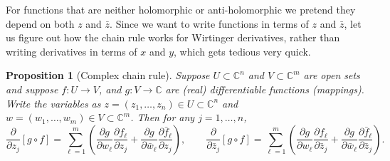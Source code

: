 \documentclass[12pt,openany]{book}
\newcommand{\C}{{\mathbb{C}}}
\theoremstyle{plain}
\newtheorem{prop}[thm]{Proposition}
\theoremstyle{remark}
\theoremstyle{definition}
\theoremstyle{exercise}
\theoremstyle{example}
\begin{document}
For functions that are neither holomorphic or anti-holomorphic we
pretend they depend on both $z$ and $\bar{z}$.
Since we want to write functions in terms of $z$ and $\bar{z}$,
let us figure out how the chain rule works for Wirtinger derivatives,
rather than writing derivatives in terms of $x$ and $y$, which
gets tedious very quick.

\begin{prop}[Complex chain rule]
Suppose 
$U \subset \C^n$ and $V \subset \C^m$ are open sets and suppose
$f \colon U \to V$, and $g \colon V \to \C$ are (real) differentiable
functions (mappings).  Write the variables as
$z = (z_1,\ldots,z_n) \in U \subset \C^n$ and $w = (w_1,\ldots,w_m) \in V
\subset \C^m$.  Then for any $j=1,\ldots,n$,
\begin{equation} \label{eq:chainrule}
\frac{\partial}{\partial z_j} \left[ g \circ f \right]
=
\sum_{\ell=1}^m \left(
\frac{\partial g}{\partial w_\ell}
\frac{\partial f_\ell}{\partial z_j}
+
\frac{\partial g}{\partial \bar{w}_\ell}
\frac{\partial \bar{f}_\ell}{\partial z_j}
\right),  \qquad
\frac{\partial}{\partial \bar{z}_j} \left[ g \circ f \right]
=
\sum_{\ell=1}^m \left(
\frac{\partial g}{\partial w_\ell}
\frac{\partial f_\ell}{\partial \bar{z}_j}
+
\frac{\partial g}{\partial \bar{w}_\ell}
\frac{\partial \bar{f}_\ell}{\partial \bar{z}_j}
\right) .
\end{equation}
\end{prop}
\end{document}
